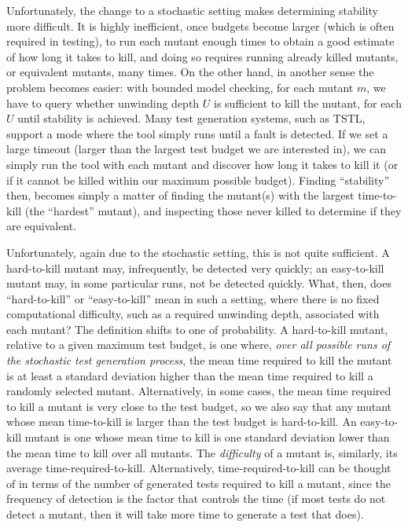 \documentclass{svjour3}
\begin{document}
Unfortunately, the change to a stochastic setting makes determining
stability more difficult.  It is highly inefficient, once budgets
become larger (which is often required in testing), to run each mutant
enough times to obtain a good estimate of how long it takes to kill,
and doing so requires running already killed mutants, or equivalent
mutants, many times.  On the other hand, in another sense the problem
becomes easier:  with bounded model checking, for each mutant $m$, we have
to query whether unwinding depth $U$ is sufficient to kill the mutant,
for each $U$ until stability is achieved.  Many test generation
systems, such as TSTL, support a mode where the tool simply runs until
a fault is detected.  If we set a large timeout (larger than the
largest test budget we are interested in), we can simply run the tool
with each mutant and discover how long it takes to kill it (or if it
cannot be killed within our maximum possible budget).  Finding
``stability'' then, becomes simply a matter of finding the mutant(s)
with the largest time-to-kill (the ``hardest'' mutant), and inspecting those never killed to
determine if they are equivalent.

Unfortunately, again due to the stochastic setting, this is not quite
sufficient.  A hard-to-kill mutant may, infrequently, be
detected very quickly; an easy-to-kill mutant may, in some particular runs,
not be detected quickly.  What, then, does ``hard-to-kill'' or
``easy-to-kill'' mean in such a setting, where there is no fixed
computational difficulty, such as a required unwinding depth,
associated with each mutant?  The definition shifts to one of
probability.  A hard-to-kill mutant, relative to a given maximum test budget,
is one where, \emph{over all possible runs of the stochastic test
  generation process}, the mean time required to kill the mutant is
at least a standard deviation higher than the mean time required to
kill a randomly selected mutant.  Alternatively, in some cases, the
mean time required to kill a mutant is very close to the test budget,
so we also say that any mutant whose mean time-to-kill is larger than
the test budget is hard-to-kill.  An easy-to-kill mutant is one whose
mean time to kill is one standard deviation lower than the mean time
to kill over all mutants.  The \emph{difficulty} of a mutant is,
similarly, its average time-required-to-kill.  Alternatively,
time-required-to-kill can be thought of in terms of the number of
generated tests required to kill a mutant, since the frequency of
detection is the factor that controls the time (if most tests do not
detect a mutant, then it will take more time to generate a test that does).
\end{document}
